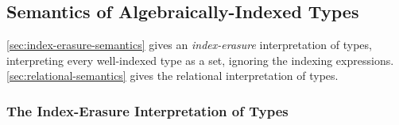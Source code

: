 \subsection{Semantics of Algebraically-Indexed Types}
\label{sec:semantics-algebraically-indexed-types}


\autoref{sec:index-erasure-semantics} gives an \emph{index-erasure}
interpretation of types, interpreting every well-indexed type as a
set, ignoring the indexing expressions.
\autoref{sec:relational-semantics} gives the relational interpretation
of types.


\subsubsection{The Index-Erasure Interpretation of Types}
\label{sec:index-erasure-semantics}

